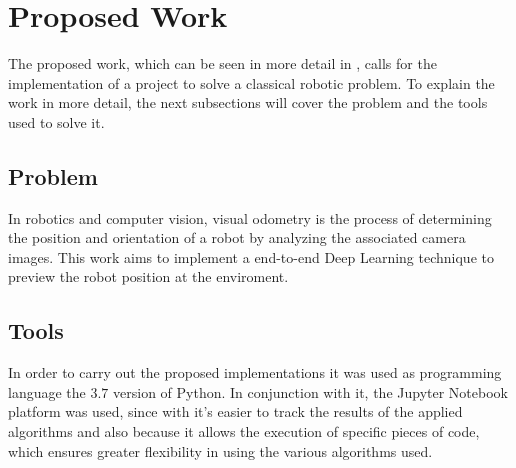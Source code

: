 \section{Proposed Work}\label{sec:trabalho-proposto}
    
    The proposed work, which can be seen in more detail in , calls for the implementation of a project to solve a classical robotic problem. To explain the work in more detail, the next subsections will cover the problem and the tools used to solve it.
    
    \subsection{Problem}
        In robotics and computer vision, visual odometry is the process of determining the position and orientation of a robot by analyzing the associated camera images. This work aims to implement a end-to-end Deep Learning technique to preview the robot position at the enviroment.
        
    \subsection{Tools}\label{sec:org-proj}
        In order to carry out the proposed implementations it was used as programming language the $3.7$ version of Python. In conjunction with it, the Jupyter Notebook platform was used, since with it's easier to track the results of the applied algorithms and also because it allows the execution of specific pieces of code, which ensures greater flexibility in using the various algorithms used.